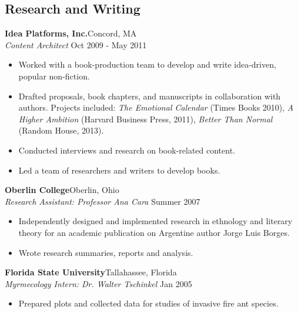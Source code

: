 \documentclass[margin,centered]{resume}
\newcommand{\employerName}[1]{\textbf{#1}}
\newcommand{\jobPosition}[1]{\textit{#1}}
\begin{document}
\begin{resume}
\section{\mysidestyle Research and Writing}
	
    {\employerName{Idea Platforms, Inc.}}\hfill Concord, MA\\
    \jobPosition{Content Architect} \hfill Oct 2009 - May 2011 \\
    \begin{itemize}  \itemsep -2pt 
    	\item Worked with a book-production team to develop and write idea-driven, popular non-fiction.
    	\item Drafted proposals, book chapters, and manuscripts in collaboration with authors. Projects included: \emph{The Emotional Calendar} (Times Books 2010), \emph{A Higher Ambition} (Harvard Business Press, 2011), \emph{Better Than Normal} (Random House, 2013).
		\item Conducted interviews and research on book-related content.
		\item Led a team of researchers and writers to develop books.
    	\end{itemize} 
    \vspace{1mm}

    {\employerName{Oberlin College}}\hfill Oberlin, Ohio\\
    \jobPosition{Research Assistant: Professor Ana Cara} \hfill Summer 2007 \\
    \begin{itemize}  \itemsep -2pt 
    	\item Independently designed and implemented research in ethnology and literary theory for an academic publication on Argentine author Jorge Luis Borges. 
	    \item Wrote research summaries, reports and analysis.  
    \end{itemize} 
	    \vspace{1mm}
     
    {\employerName{Florida State University}}\hfill Tallahassee, Florida\\
    \jobPosition{Myrmecology Intern: Dr. Walter Tschinkel} \hfill Jan 2005 \\
    \begin{itemize}  \itemsep -2pt 
    	\item Prepared plots and collected data for studies of invasive fire ant species.
    \end{itemize} 
	\vspace{1mm}
	

\end{resume}
\end{document}
